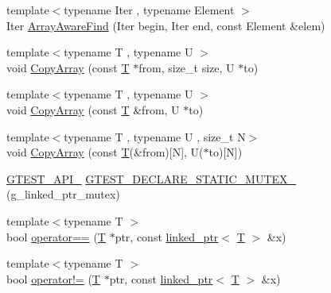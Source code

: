 \begin{DoxyCompactItemize}
\item 
{\footnotesize template$<$typename Iter , typename Element $>$ }\\Iter \hyperlink{namespacetesting_1_1internal_a94a857fe6ff32cf4fdc4769a4071f239}{Array\+Aware\+Find} (Iter begin, Iter end, const Element \&elem)
\item 
{\footnotesize template$<$typename T , typename U $>$ }\\void \hyperlink{namespacetesting_1_1internal_afb1b9728aaaf6d9fe6246a19cfe3f7f5}{Copy\+Array} (const \hyperlink{functions__7_8js_adf1f3edb9115acb0a1e04209b7a9937b}{T} $\ast$from, size\+\_\+t size, U $\ast$to)
\item 
{\footnotesize template$<$typename T , typename U $>$ }\\void \hyperlink{namespacetesting_1_1internal_a84d0e746ba0827cc52b53d22000de0e8}{Copy\+Array} (const \hyperlink{functions__7_8js_adf1f3edb9115acb0a1e04209b7a9937b}{T} \&from, U $\ast$to)
\item 
{\footnotesize template$<$typename T , typename U , size\+\_\+t N$>$ }\\void \hyperlink{namespacetesting_1_1internal_a1e7ae855686720615dcd5754c8181c62}{Copy\+Array} (const \hyperlink{functions__7_8js_adf1f3edb9115acb0a1e04209b7a9937b}{T}(\&from)\mbox{[}N\mbox{]}, U($\ast$to)\mbox{[}N\mbox{]})
\item 
\hyperlink{gtest-port_8h_aa73be6f0ba4a7456180a94904ce17790}{G\+T\+E\+S\+T\+\_\+\+A\+P\+I\+\_\+} \hyperlink{namespacetesting_1_1internal_ad7c5625384cf5f6b714188f274537ef6}{G\+T\+E\+S\+T\+\_\+\+D\+E\+C\+L\+A\+R\+E\+\_\+\+S\+T\+A\+T\+I\+C\+\_\+\+M\+U\+T\+E\+X\+\_\+} (g\+\_\+linked\+\_\+ptr\+\_\+mutex)
\item 
{\footnotesize template$<$typename T $>$ }\\bool \hyperlink{namespacetesting_1_1internal_ad1cb54a206a209ddace17a05359d38ae}{operator==} (\hyperlink{functions__7_8js_adf1f3edb9115acb0a1e04209b7a9937b}{T} $\ast$ptr, const \hyperlink{classtesting_1_1internal_1_1linked__ptr}{linked\+\_\+ptr}$<$ \hyperlink{functions__7_8js_adf1f3edb9115acb0a1e04209b7a9937b}{T} $>$ \&x)
\item 
{\footnotesize template$<$typename T $>$ }\\bool \hyperlink{namespacetesting_1_1internal_a6910869259f8f31825b471e9190fa09a}{operator!=} (\hyperlink{functions__7_8js_adf1f3edb9115acb0a1e04209b7a9937b}{T} $\ast$ptr, const \hyperlink{classtesting_1_1internal_1_1linked__ptr}{linked\+\_\+ptr}$<$ \hyperlink{functions__7_8js_adf1f3edb9115acb0a1e04209b7a9937b}{T} $>$ \&x)

\end{DoxyCompactItemize}
